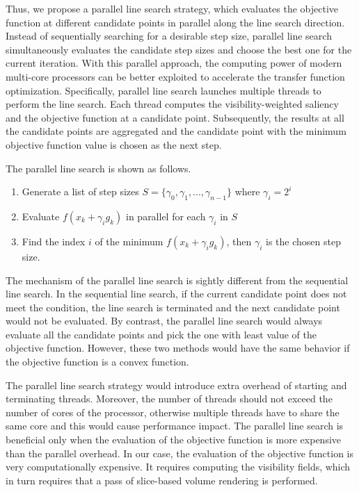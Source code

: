 Thus, we propose a parallel line search strategy, which evaluates the objective function at different candidate points in parallel along the line search direction. Instead of sequentially searching for a desirable step size, parallel line search simultaneously evaluates the candidate step sizes and choose the best one for the current iteration.
With this parallel approach, the computing power of modern multi-core processors can be better exploited to accelerate the transfer function optimization. Specifically, parallel line search launches multiple threads to perform the line search. Each thread computes the visibility-weighted saliency and the objective function at a candidate point. Subsequently, the results at all the candidate points are aggregated and the candidate point with the minimum objective function value is chosen as the next step.

The parallel line search is shown as follows.

\begin{enumerate}
	\item Generate a list of step sizes $ S= \{ \gamma_{0},\gamma_{1},...,\gamma_{n-1} \} $ where $ \gamma_{i}=2^{i} $
	\item Evaluate $ f(x_{k}+\gamma_{i} g_{k}) $ in parallel for each $ \gamma_{i} $ in $ S $
	\item Find the index $ i $ of the minimum $ f(x_{k}+\gamma_{i} g_{k}) $, then $ \gamma_{i} $ is the chosen step size.
\end{enumerate}

The mechanism of the parallel line search is sightly different from the sequential line search. In the sequential line search, if the current candidate point does not meet the condition, the line search is terminated and the next candidate point would not be evaluated. By contrast, the parallel line search would always evaluate all the candidate points and pick the one with least value of the objective function. However, these two methods would have the same behavior if the objective function is a convex function.

The parallel line search strategy would introduce extra overhead of starting and terminating threads. Moreover, the number of threads should not exceed the number of cores of the processor, otherwise multiple threads have to share the same core and this would cause performance impact. The parallel line search is beneficial only when the evaluation of the objective function is more expensive than the parallel overhead.
In our case, the evaluation of the objective function is very computationally expensive. It requires computing the visibility fields, which in turn requires that a pass of slice-based volume rendering is performed.

